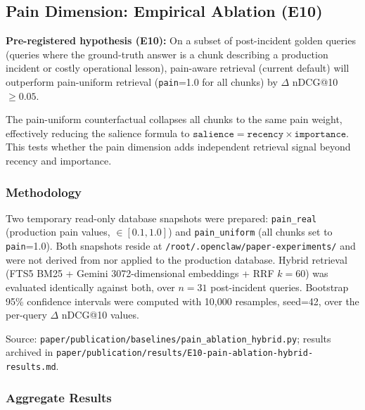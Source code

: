 \subsection{Pain Dimension: Empirical Ablation (E10)}
\label{sec:pain-ablation}

\textbf{Pre-registered hypothesis (E10):} On a subset of post-incident golden queries
(queries where the ground-truth answer is a chunk describing a production incident or
costly operational lesson), pain-aware retrieval (current default) will outperform
pain-uniform retrieval (\texttt{pain}=1.0 for all chunks) by $\Delta$ nDCG@10 $\geq 0.05$.

The pain-uniform counterfactual collapses all chunks to the same pain weight, effectively
reducing the salience formula to
$\texttt{salience} = \texttt{recency} \times \texttt{importance}$. This tests whether the
pain dimension adds independent retrieval signal beyond recency and importance.

\subsubsection{Methodology}

Two temporary read-only database snapshots were prepared: \texttt{pain\_real} (production
pain values, $\in [0.1, 1.0]$) and \texttt{pain\_uniform} (all chunks set to
\texttt{pain}=1.0). Both snapshots reside at \texttt{/root/.openclaw/paper-experiments/}
and were not derived from nor applied to the production database. Hybrid retrieval (FTS5
BM25 + Gemini 3072-dimensional embeddings + RRF $k=60$) was evaluated identically against
both, over $n=31$ post-incident queries. Bootstrap 95\% confidence intervals were computed
with 10,000 resamples, seed=42, over the per-query $\Delta$ nDCG@10 values.

Source: \texttt{paper/publication/baselines/pain\_ablation\_hybrid.py}; results archived in
\texttt{paper/publication/results/E10-pain-ablation-hybrid-results.md}.

\subsubsection{Aggregate Results}

